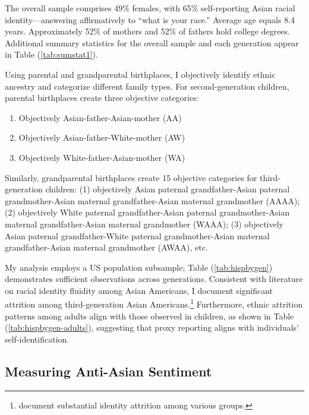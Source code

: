 The overall sample comprises 49\% females, with 65\% self-reporting Asian racial identity—answering affirmatively to ``what is your race.'' Average age equals 8.4 years. Approximately 52\% of mothers and 52\% of fathers hold college degrees. Additional summary statistics for the overall sample and each generation appear in Table (\ref{tab:sumstat1}).

Using parental and grandparental birthplaces, I objectively identify ethnic ancestry and categorize different family types. For second-generation children, parental birthplaces create three objective categories:
\begin{enumerate}
\item Objectively Asian-father-Asian-mother (AA)
\item Objectively Asian-father-White-mother (AW)  
\item Objectively White-father-Asian-mother (WA)
\end{enumerate}

Similarly, grandparental birthplaces create 15 objective categories for third-generation children: (1) objectively Asian paternal grandfather-Asian paternal grandmother-Asian maternal grandfather-Asian maternal grandmother (AAAA); (2) objectively White paternal grandfather-Asian paternal grandmother-Asian maternal grandfather-Asian maternal grandmother (WAAA); (3) objectively Asian paternal grandfather-White paternal grandmother-Asian maternal grandfather-Asian maternal grandmother (AWAA), etc.

My analysis employs a US population subsample; Table (\ref{tab:hispbygen}) demonstrates sufficient observations across generations. Consistent with literature on racial identity fluidity among Asian Americans, I document significant attrition among third-generation Asian Americans.\footnote{\textcite{duncanIdentifyingLaterGenerationDescendants2018,duncanSocioeconomicIntegrationImmigrant2018, antmanEthnicAttritionObserved2016,antmanEthnicAttritionAssimilation2020} document substantial identity attrition among various groups.} Furthermore, ethnic attrition patterns among adults align with those observed in children, as shown in Table (\ref{tab:hispbygen-adults}), suggesting that proxy reporting aligns with individuals' self-identification. 

\subsection{Measuring Anti-Asian Sentiment}\label{sub:lw-bias}

